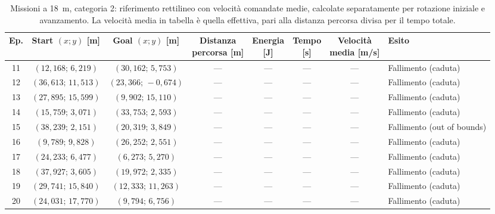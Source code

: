 \begin{table}[H]
\centering
\caption{Missioni a 18~m, categoria 2: riferimento rettilineo con velocità comandate medie, calcolate separatamente per rotazione iniziale e avanzamento. La velocità media in tabella è quella effettiva, pari alla distanza percorsa divisa per il tempo totale.}
\label{tab:straight-line-command-mean-18m-cat2}
\begingroup
\fontsize{9}{11}\selectfont
\setlength{\tabcolsep}{2.5pt}
\renewcommand{\arraystretch}{1.2}
\begin{tabular}{@{}c cc cccc l@{}}
\toprule
Ep. & \shortstack{Start $(x;y)$\\{}[m]} & \shortstack{Goal $(x;y)$\\{}[m]} & \shortstack{Distanza\\percorsa [m]} & \shortstack{Energia\\{}[J]} & \shortstack{Tempo\\{}[s]} & \shortstack{Velocità\\media [m/s]} & Esito \\
\midrule
11 & $(12{,}168;\,6{,}219)$ & $(30{,}162;\,5{,}753)$ & --- & --- & --- & --- & Fallimento (caduta) \\
12 & $(36{,}613;\,11{,}513)$ & $(23{,}366;\,-0{,}674)$ & --- & --- & --- & --- & Fallimento (caduta) \\
13 & $(27{,}895;\,15{,}599)$ & $(9{,}902;\,15{,}110)$ & --- & --- & --- & --- & Fallimento (caduta) \\
14 & $(15{,}759;\,3{,}071)$ & $(33{,}753;\,2{,}593)$ & --- & --- & --- & --- & Fallimento (caduta) \\
15 & $(38{,}239;\,2{,}151)$ & $(20{,}319;\,3{,}849)$ & --- & --- & --- & --- & Fallimento (out of bounds) \\
16 & $(9{,}789;\,9{,}828)$ & $(26{,}252;\,2{,}551)$ & --- & --- & --- & --- & Fallimento (caduta) \\
17 & $(24{,}233;\,6{,}477)$ & $(6{,}273;\,5{,}270)$ & --- & --- & --- & --- & Fallimento (caduta) \\
18 & $(37{,}927;\,3{,}605)$ & $(19{,}972;\,2{,}335)$ & --- & --- & --- & --- & Fallimento (caduta) \\
19 & $(29{,}741;\,15{,}840)$ & $(12{,}333;\,11{,}263)$ & --- & --- & --- & --- & Fallimento (caduta) \\
20 & $(24{,}031;\,17{,}770)$ & $(9{,}794;\,6{,}756)$ & --- & --- & --- & --- & Fallimento (caduta) \\
\bottomrule
\end{tabular}
\endgroup
\end{table}


